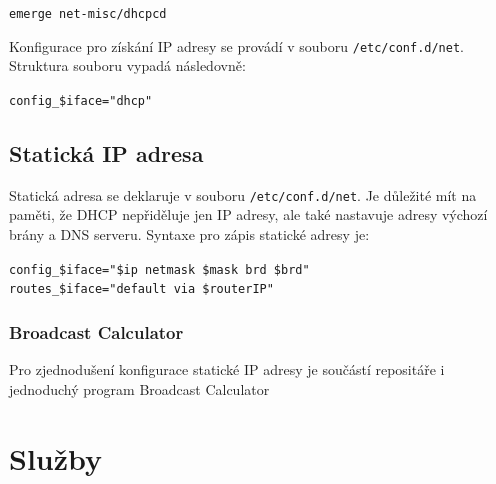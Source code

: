 \documentclass[12pt,a4paper,twoside,]{article}
\begin{document}
\texttt{emerge net-misc/dhcpcd}

\hspace*{-1.5em}Konfigurace pro získání IP adresy se provádí v souboru \texttt{/etc/conf.d/net}. \\Struktura souboru vypadá následovně:

\texttt{config\_\$iface="dhcp"}

\subsection{\textsf{Statická IP adresa}}
Statická adresa se deklaruje v souboru \texttt{/etc/conf.d/net}. Je důležité mít na paměti, že DHCP nepřiděluje jen IP adresy, ale také nastavuje adresy výchozí brány a DNS serveru. Syntaxe pro zápis statické adresy je:

\texttt{config\_\$iface="\$ip netmask \$mask brd \$brd"}\\
\hspace*{1.5em}\texttt{routes\_\$iface="default via \$routerIP"}
\subsubsection{\textsf{Broadcast Calculator}}
Pro zjednodušení konfigurace statické IP adresy je součástí repositáře i jednoduchý program Broadcast Calculator
\section{\textsf{Služby}}
\end{document}
